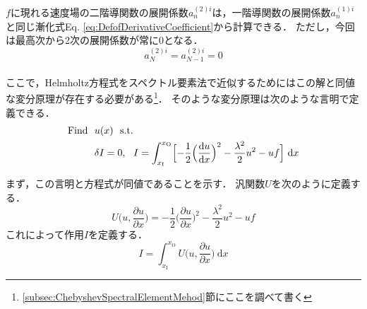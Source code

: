 \documentclass[12pt,a4paper]{jsarticle}
\begin{document}
$f$に現れる速度場の二階導関数の展開係数$a_{n}^{(2)i}$は，一階導関数の展開係数$a_{n}^{(1)i}$と同じ漸化式Eq. \ref{eq:DefofDerivativeCoefficient}から計算できる．
ただし，今回は最高次から2次の展開係数が常に0となる．
\begin{equation}
  a_{N}^{(2)i} = a_{N-1}^{(2)i} = 0
  \label{eq:DefofMaximumSecondDerivativeCoefficient}
\end{equation}\\

ここで，Helmholtz方程式をスペクトル要素法で近似するためにはこの解と同値な変分原理が存在する必要がある\footnote{\ref{subsec:ChebyshevSpectralElementMehod}節にここを調べて書く}．
そのような変分原理は次のような言明で定義できる．
\begin{align*}
  \mathrm{Find} ~~ &u(x) ~~\mathrm{s.t.} \\
  &\delta I = 0, ~~ I = \int_{x_{\text{I}}}^{x_{\text{O}}} \Bigl[ -\frac{1}{2} \Big( \frac{\mathrm{d} u}{\mathrm{d} x} \Big)^2 - \frac{\lambda^2}{2} u^2 -uf \Bigr] ~\mathrm{d}x
  \label{eq:DefofVariationalPrinciple}
\end{align*}

まず，この言明と方程式が同値であることを示す．
汎関数$U$を次のように定義する．
\begin{equation}
  U \Big( u, \frac{\partial u}{\partial x} \Big) = -\frac{1}{2} \Big( \frac{\partial u}{\partial x} \Big)^2 - \frac{\lambda^2}{2} u^2 -uf
  \label{eq:DefofFunctional}
\end{equation}
これによって作用$I$を定義する．
\begin{equation}
  I = \int_{x_{\text{I}}}^{x_{\text{O}}} U \Big( u, \frac{\partial u}{\partial x} \Big) ~\mathrm{d}x
  \label{eq:DefofAction}
\end{equation}
\end{document}
